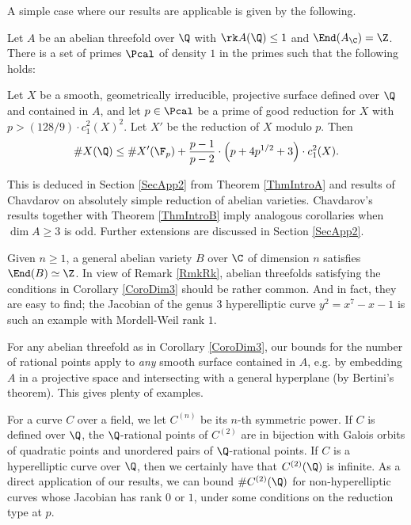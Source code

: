 A simple case where our results are applicable is given by the following.
\begin{corollary}
\notready\label{CoroDim3} Let $A$ be an abelian threefold over $\Q$ with $\rk A(\Q)\le 1$ and $\End (A_\C) = \Z$. There is a set of primes $\Pcal$ of density $1$ in the primes  such that the following holds:

Let $X$ be a smooth, geometrically irreducible, projective surface defined over $\Q$ and contained in $A$, and let $p\in \Pcal$ be a prime of good reduction for $X$ with $p>(128/9) \cdot c_1^2(X)^2$. Let $X'$ be the reduction of $X$ modulo $p$. Then
$$
\#X(\Q) \le \# X'(\F_p) + \frac{p-1}{p-2}\cdot \left(p+4p^{1/2} + 3\right)\cdot c_1^2(X).
$$
\end{corollary}



This is deduced in Section \ref{SecApp2} from Theorem \ref{ThmIntroA} and results of Chavdarov \cite{Chavdarov} on absolutely simple reduction of abelian varieties. Chavdarov's results together with Theorem \ref{ThmIntroB} imply analogous corollaries when $\dim A\ge 3$ is odd. Further extensions are discussed in Section \ref{SecApp2}.


\begin{remark}
\notready Given $n\ge 1$, a general abelian variety $B$ over $\C$ of  dimension $n$ satisfies $\End(B)\simeq \Z$. In view of Remark \ref{RmkRk}, abelian threefolds satisfying the conditions in Corollary \ref{CoroDim3} should be rather common. And in fact, they are easy to find; the Jacobian of the genus $3$ hyperelliptic curve $y^2=x^7-x-1$ is such an example with Mordell-Weil rank $1$.
\end{remark}

\begin{remark}
\notready For any abelian threefold as in Corollary \ref{CoroDim3}, our bounds for the number of rational points apply to \emph{any} smooth surface contained in $A$, e.g. by embedding $A$ in a projective space and intersecting with a general hyperplane (by Bertini's theorem). This gives plenty of examples.
\end{remark}

For a curve $C$ over a field, we let $C^{(n)}$ be its $n$-th symmetric power. If $C$ is defined over $\Q$, the $\Q$-rational points of $C^{(2)}$ are in bijection with Galois orbits of quadratic points and unordered pairs of $\Q$-rational points. If $C$ is a hyperelliptic curve over $\Q$, then we certainly have that $C^{(2)}(\Q)$ is infinite. As a direct application of our results, we can bound $\# C^{(2)}(\Q)$ for non-hyperelliptic curves  whose Jacobian has rank $0$ or  $1$, under some conditions on the reduction type at $p$.

